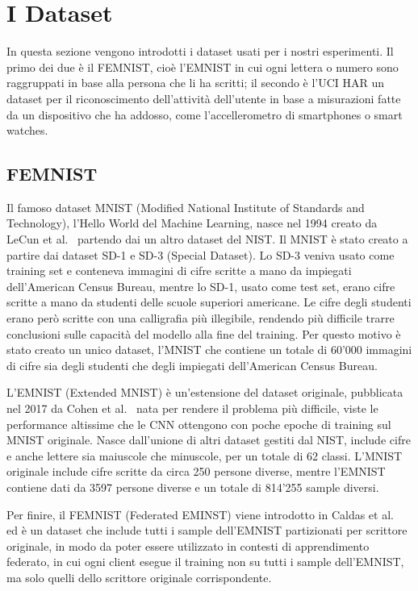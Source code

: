 \chapter{I Dataset}
In questa sezione vengono introdotti i dataset usati per i nostri
esperimenti. Il primo dei due è il FEMNIST, cioè l'EMNIST 
in cui ogni lettera o numero sono raggruppati in base alla 
persona che li ha scritti; il secondo è l'UCI HAR un dataset per il
riconoscimento dell'attività dell'utente in base a misurazioni fatte
da un dispositivo che ha addosso, come l'accellerometro di smartphones
o smart watches.

\section{FEMNIST}
Il famoso dataset MNIST (Modified National Institute of Standards and
Technology), l'Hello World del Machine Learning, nasce nel 1994 creato 
da LeCun et al.~\cite{lecun1998mnist} partendo dai un altro dataset del NIST.
Il MNIST è stato creato a partire dai dataset SD-1 e SD-3 (Special
Dataset). Lo SD-3 veniva usato come training set e conteneva immagini
di cifre scritte a mano da impiegati dell'American Census Bureau,
mentre lo SD-1, usato come test set, erano cifre scritte a mano da 
studenti delle scuole superiori americane. Le cifre degli studenti
erano però scritte con una calligrafia più illegibile, rendendo più 
difficile trarre conclusioni sulle capacità del modello alla fine del
training. Per questo motivo è stato creato un unico dataset, l'MNIST 
che contiene un totale di 60'000 immagini di cifre sia degli studenti
che degli impiegati dell'American Census Bureau.

L'EMNIST (Extended MNIST) è un'estensione del dataset originale,
pubblicata nel 2017 da Cohen et al.~\cite{cohen2017emnist} nata 
per rendere il problema più difficile, viste le performance altissime
che le CNN ottengono con poche epoche di training sul MNIST originale.
Nasce dall'unione di altri dataset gestiti dal NIST, include cifre e
anche lettere sia maiuscole che minuscole, per un totale di 62 classi.
L'MNIST originale include cifre scritte da circa 250 persone diverse,
mentre l'EMNIST contiene dati da 3597 persone diverse e un totale di 
814'255 sample diversi.

Per finire, il FEMNIST (Federated EMINST)
viene introdotto in Caldas et al.~\cite{caldas2019femnist}
ed è un dataset che include tutti i sample dell'EMNIST partizionati
per scrittore originale, in modo da poter essere utilizzato in contesti
di apprendimento federato, in cui ogni client esegue il training non su
tutti i sample dell'EMNIST, ma solo quelli dello scrittore originale
corrispondente.

